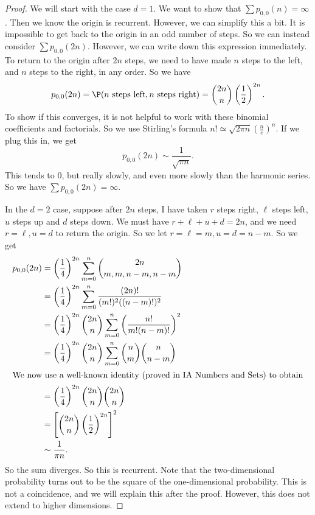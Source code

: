 \documentclass[a4paper]{article}
\begin{document}
\begin{proof}
  We will start with the case $d = 1$. We want to show that $\sum p_{0, 0}(n) = \infty$. Then we know the origin is recurrent. However, we can simplify this a bit. It is impossible to get back to the origin in an odd number of steps. So we can instead consider $\sum p_{0, 0}(2n)$. However, we can write down this expression immediately. To return to the origin after $2n$ steps, we need to have made $n$ steps to the left, and $n$ steps to the right, in any order. So we have
  \[
    p_{0, 0}(2n) = \P(n\text{ steps left}, n\text{ steps right}) = \binom{2n}{n} \left(\frac{1}{2}\right)^{2n}.
  \]
  To show if this converges, it is not helpful to work with these binomial coefficients and factorials. So we use Stirling's formula $n! \simeq \sqrt{2\pi n}\left(\frac{n}{e}\right)^n$. If we plug this in, we get
  \[
    p_{0, 0}(2n) \sim \frac{1}{\sqrt{\pi n}}.
  \]
  This tends to $0$, but really slowly, and even more slowly than the harmonic series. So we have $\sum p_{0, 0}(2n) = \infty$.

  In the $d = 2$ case, suppose after $2n$ steps, I have taken $r$ steps right, $\ell$ steps left, $u$ steps up and $d$ steps down. We must have $r + \ell + u + d = 2n$, and we need $r = \ell, u = d$ to return the origin. So we let $r = \ell = m, u = d = n - m$. So we get
  \begin{align*}
    p_{0, 0}(2n) &= \left(\frac{1}{4}\right)^{2n} \sum_{m = 0}^n \binom{2n}{m, m, n - m, n - m} \\
    &= \left(\frac{1}{4}\right)^{2n} \sum_{m = 0}^n \frac{(2n)!}{(m!)^2 ((n - m)!)^2} \\
    &= \left(\frac{1}{4}\right)^{2n} \binom{2n}{n}\sum_{m = 0}^n \left(\frac{n!}{m!(n - m)!}\right)^2\\
    &= \left(\frac{1}{4}\right)^{2n} \binom{2n}{n}\sum_{m = 0}^n \binom{n}{m}\binom{n}{n - m}\\
    \intertext{We now use a well-known identity (proved in IA Numbers and Sets) to obtain}
    &= \left(\frac{1}{4}\right)^{2n} \binom{2n}{n} \binom{2n}{n}\\
    &= \left[\binom{2n}{n} \left(\frac{1}{2}\right)^{2n}\right]^2\\
    &\sim \frac{1}{\pi n}.
  \end{align*}
  So the sum diverges. So this is recurrent. Note that the two-dimensional probability turns out to be the square of the one-dimensional probability. This is not a coincidence, and we will explain this after the proof. However, this does not extend to higher dimensions.


\end{proof}
\end{document}
